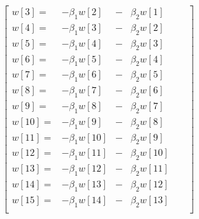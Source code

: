 \documentclass[10pt]{amsart}
\begin{document}
\[\begin{bmatrix}
  w[ 3] = &- \beta_1 w[ 2] &- & \beta_2 w[ 1]  &                   &                 \\
  w[ 4] = &- \beta_1 w[ 3] &- & \beta_2 w[ 2]  &                   &                 \\
  w[ 5] = &- \beta_1 w[ 4] &- & \beta_2 w[ 3]  &                   &                 \\
  w[ 6] = &- \beta_1 w[ 5] &- & \beta_2 w[ 4]  &                   &                 \\
  w[ 7] = &- \beta_1 w[ 6] &- & \beta_2 w[ 5]  &                   &                 \\
  w[ 8] = &- \beta_1 w[ 7] &- & \beta_2 w[ 6]  &                   &                 \\
  w[ 9] = &- \beta_1 w[ 8] &- & \beta_2 w[ 7]  &                   &                 \\
  w[10] = &- \beta_1 w[ 9] &- & \beta_2 w[ 8]  &                   &                 \\
  w[11] = &- \beta_1 w[10] &- & \beta_2 w[ 9]  &                   &                 \\
  w[12] = &- \beta_1 w[11] &- & \beta_2 w[10]  &                   &                 \\
  w[13] = &- \beta_1 w[12] &- & \beta_2 w[11]  &                   &                 \\
  w[14] = &- \beta_1 w[13] &- & \beta_2 w[12]  &                   &                 \\
  w[15] = &- \beta_1 w[14] &- & \beta_2 w[13]  &                   &                 \\
\end{bmatrix}
\]
\end{document}
